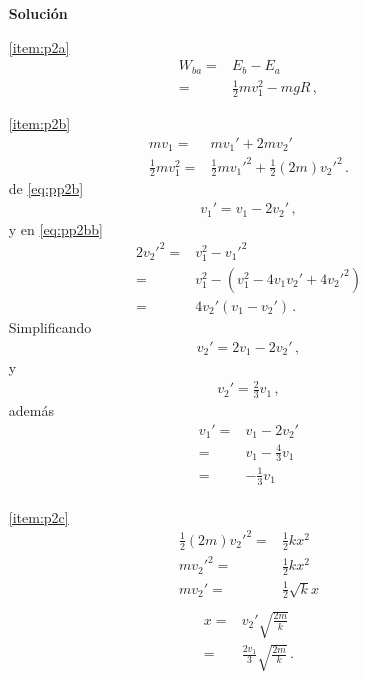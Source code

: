 \begin{enumerate}
  \begin{itemize}
  \item[\textbf{Solución}]
  \item[\ref{item:p2a}]
    \begin{align*}
      W_{ba}=&E_b-E_a\nonumber\\
      =&\tfrac{1}{2}m v_1^2-mgR\,,
    \end{align*}
  \item[\ref{item:p2b}] 
    \begin{align}
      \label{eq:pp2b}
      m v_1=&m v_1'+2m v_2'\\
      \label{eq:pp2bb}
      \tfrac{1}{2}m v_1^2=&\tfrac{1}{2}m {v_1'}^2+\tfrac{1}{2}(2m){v_2'}^2\,.
    \end{align}
    de \eqref{eq:pp2b}
    \begin{align*}
      v_1'=v_1-2v_2'\,,
    \end{align*}
    y en \eqref{eq:pp2bb}
    \begin{align*}
      2{v_2'}^2=&v_1^2-{v_1'}^2\nonumber\\
      =&v_1^2-(v_1^2-4 v_1 v_2'+4{v_2'}^2)\nonumber\\
      =&4v_2'(v_1-v_2')\,.
    \end{align*}
    Simplificando
    \begin{align*}
      v_2'=2v_1-2v_2'\,,
    \end{align*}
    y
    \begin{align*}
      v_2'=\tfrac{2}{3}v_1\,,
    \end{align*}
    además
    \begin{align*}
      v_1'=&v_1-2v_2'\nonumber\\
      =&v_1-\tfrac{4}{3}v_1\nonumber\\
      =&-\tfrac{1}{3}v_1\nonumber\\
    \end{align*}
  \item[\ref{item:p2c}]
    \begin{align*}
      \tfrac{1}{2}(2m){v_2'}^2=&\tfrac{1}{2}kx^2\nonumber\\
       m{v_2'}^2=&\tfrac{1}{2}kx^2\nonumber\\
       mv_2'=&\tfrac{1}{2}\sqrt{k}x\nonumber\\
    \end{align*}
    \begin{align*}
      x=&{v_2'}\sqrt{\frac{2m}{k}}\nonumber\\
      =&\frac{2v_1}{3}\sqrt{\frac{2m}{k}}\,.
    \end{align*}
  \end{itemize}




\end{enumerate}

